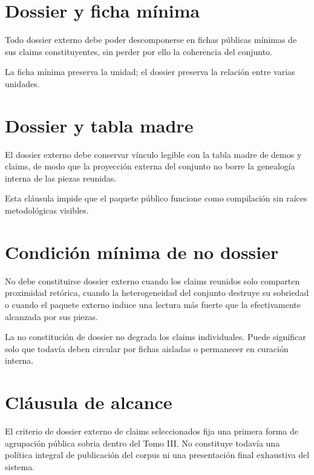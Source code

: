 \section{Dossier y ficha mínima}
\begin{definition}
Todo dossier externo debe poder descomponerse en fichas públicas mínimas de sus claims constituyentes, sin perder por ello la coherencia del conjunto.
\end{definition}

\begin{observation}
La ficha mínima preserva la unidad; el dossier preserva la relación entre varias unidades.
\end{observation}

\section{Dossier y tabla madre}
\begin{definition}
El dossier externo debe conservar vínculo legible con la tabla madre de demos y claims, de modo que la proyección externa del conjunto no borre la genealogía interna de las piezas reunidas.
\end{definition}

\begin{observation}
Esta cláusula impide que el paquete público funcione como compilación sin raíces metodológicas visibles.
\end{observation}

\section{Condición mínima de no dossier}
\begin{definition}
No debe constituirse dossier externo cuando los claims reunidos solo comparten proximidad retórica, cuando la heterogeneidad del conjunto destruye su sobriedad o cuando el paquete externo induce una lectura más fuerte que la efectivamente alcanzada por sus piezas.
\end{definition}

\begin{observation}
La no constitución de dossier no degrada los claims individuales. Puede significar solo que todavía deben circular por fichas aisladas o permanecer en curación interna.
\end{observation}

\section{Cláusula de alcance}
\begin{observation}
El criterio de dossier externo de claims seleccionados fija una primera forma de agrupación pública sobria dentro del Tomo III. No constituye todavía una política integral de publicación del corpus ni una presentación final exhaustiva del sistema.
\end{observation}

